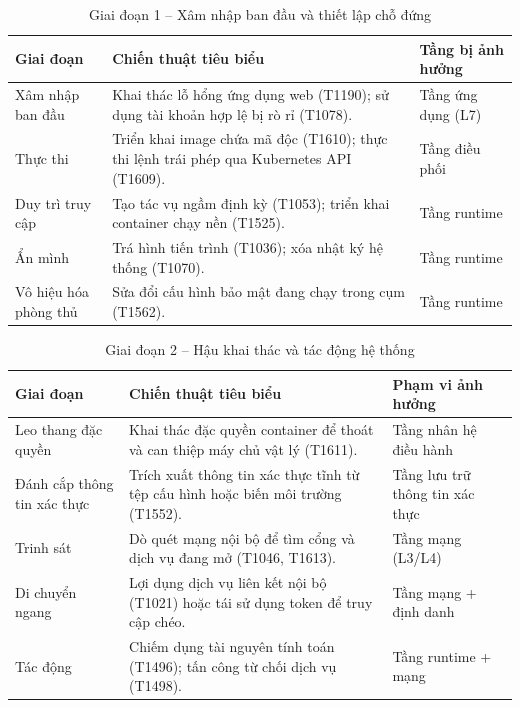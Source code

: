 \begin{table}[H]
\centering
\caption{Giai đoạn 1 -- Xâm nhập ban đầu và thiết lập chỗ đứng}
\label{tab:mitre_phase1}
\renewcommand{\arraystretch}{1.3}
\begin{tabularx}{\textwidth}{|p{3.5cm}|X|p{3.5cm}|}
\hline
\textbf{Giai đoạn} & \textbf{Chiến thuật tiêu biểu} & \textbf{Tầng bị ảnh hưởng} \\
\hline
Xâm nhập ban đầu &
Khai thác lỗ hổng ứng dụng web (T1190); sử dụng tài khoản hợp lệ bị rò rỉ (T1078). &
Tầng ứng dụng (L7) \\
\hline
Thực thi &
Triển khai image chứa mã độc (T1610); thực thi lệnh trái phép qua Kubernetes API (T1609). &
Tầng điều phối \\
\hline
Duy trì truy cập &
Tạo tác vụ ngầm định kỳ (T1053); triển khai container chạy nền (T1525). &
Tầng runtime \\
\hline
Ẩn mình &
Trá hình tiến trình (T1036); xóa nhật ký hệ thống (T1070). &
Tầng runtime \\
\hline
Vô hiệu hóa phòng thủ &
Sửa đổi cấu hình bảo mật đang chạy trong cụm (T1562). &
Tầng runtime \\
\hline
\end{tabularx}
\end{table}

\begin{table}[H]
\centering
\caption{Giai đoạn 2 -- Hậu khai thác và tác động hệ thống}
\label{tab:mitre_phase2}
\renewcommand{\arraystretch}{1.3}
\begin{tabularx}{\textwidth}{|p{3.5cm}|X|p{3.5cm}|}
\hline
\textbf{Giai đoạn} & \textbf{Chiến thuật tiêu biểu} & \textbf{Phạm vi ảnh hưởng} \\
\hline
Leo thang đặc quyền &
Khai thác đặc quyền container để thoát và can thiệp máy chủ vật lý (T1611). &
Tầng nhân hệ điều hành \\
\hline
Đánh cắp thông tin xác thực &
Trích xuất thông tin xác thực tĩnh từ tệp cấu hình hoặc biến môi trường (T1552). &
Tầng lưu trữ thông tin xác thực \\
\hline
Trinh sát &
Dò quét mạng nội bộ để tìm cổng và dịch vụ đang mở (T1046, T1613). &
Tầng mạng (L3/L4) \\
\hline
Di chuyển ngang &
Lợi dụng dịch vụ liên kết nội bộ (T1021) hoặc tái sử dụng token để truy cập chéo. &
Tầng mạng + định danh \\
\hline
Tác động &
Chiếm dụng tài nguyên tính toán (T1496); tấn công từ chối dịch vụ (T1498). &
Tầng runtime + mạng \\
\hline
\end{tabularx}
\end{table}

